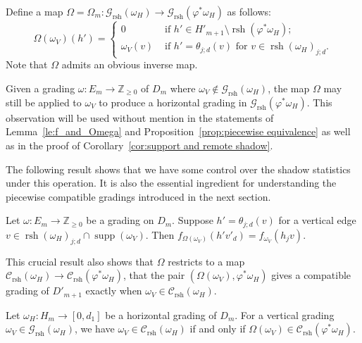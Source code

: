 \documentclass[ALCO,ThmDefs,Unicode,epreuves]{cedram}
\newcommand{\cC}{\mathcal{C}}
\newcommand{\cG}{\mathcal{G}}
\newcommand{\ZZ}{\mathbb{Z}}
\DeclareMathOperator{\supp}{supp}
\DeclareMathOperator{\rsh}{rsh}
\begin{document}
Define a map $\Omega=\Omega_m:\cG_{\rsh}(\omega_H)\to\cG_{\rsh}(\varphi^*\omega_H)$ as follows:
\[\Omega(\omega_V)(h')=
 \begin{cases}
 0 & \text{ if $h'\in H'_{m+1}\setminus\rsh(\varphi^*\omega_H)$;}\\
 \omega_V(v) & \text{ if $h'=\theta_{j;d}(v)$ for $v\in\rsh(\omega_H)_{j;d}$.}
 \end{cases}\]
Note that $\Omega$ admits an obvious inverse map. 
\begin{remark}
 Given a grading $\omega:E_m\to\ZZ_{\ge0}$ of $D_m$ where $\omega_V\notin\cG_{\rsh}(\omega_H)$, the map $\Omega$ may still be applied to $\omega_V$ to produce a horizontal grading in $\cG_{\rsh}(\varphi^*\omega_H)$. 
 This observation will be used without mention in the statements of Lemma~\ref{le:f_and_Omega} and Proposition~\ref{prop:piecewise equivalence} as well as in the proof of Corollary~\ref{cor:support and remote shadow}.
\end{remark}

The following result shows that we have some control over the shadow statistics under this operation.
It is also the essential ingredient for understanding the piecewise compatible gradings introduced in the next section.
\begin{lemma}
 \label{le:f_and_Omega}
 Let $\omega:E_m\to\ZZ_{\ge0}$ be a grading on $D_m$.
 Suppose $h'=\theta_{j;d}(v)$ for a vertical edge $v\in\rsh(\omega_H)_{j;d}\cap\supp(\omega_V)$. Then $f_{\Omega(\omega_V)}(h'v'_d)=f_{\omega_V}(h_jv)$.
\end{lemma}
This crucial result also shows that $\Omega$ restricts to a map $\cC_{\rsh}(\omega_H)\to\cC_{\rsh}(\varphi^*\omega_H)$, \ie that the pair $(\Omega(\omega_V),\varphi^*\omega_H)$ gives a compatible grading of $D'_{m+1}$ exactly when $\omega_V\in\cC_{\rsh}(\omega_H)$.
\begin{proposition}
 \label{prop:compatibility equivalence}
 Let $\omega_H:H_m\to[0,d_1]$ be a horizontal grading of $D_m$. 
 For a vertical grading $\omega_V\in\cG_{\rsh}(\omega_H)$, we have $\omega_V\in\cC_{\rsh}(\omega_H)$ if and only if $\Omega(\omega_V)\in\cC_{\rsh}(\varphi^*\omega_H)$.
\end{proposition}
\end{document}
